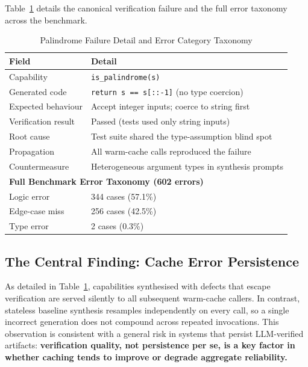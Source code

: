 \documentclass[conference]{IEEEtran}
\begin{document}
Table~\ref{tab:error} details the canonical verification failure and the
full error taxonomy across the benchmark.

\begin{table}[htbp]
  \centering
  \caption{Palindrome Failure Detail and Error Category Taxonomy}
  \label{tab:error}
  \renewcommand{\arraystretch}{1.2}
  \begin{tabular}{ll}
    \toprule
    \textbf{Field} & \textbf{Detail} \\
    \midrule
    Capability         & \texttt{is\_palindrome(s)} \\
    Generated code     & \texttt{return s == s[::-1]} (no type coercion) \\
    Expected behaviour & Accept integer inputs; coerce to string first \\
    Verification result& Passed (tests used only string inputs) \\
    Root cause         & Test suite shared the type-assumption blind spot \\
    Propagation        & All warm-cache calls reproduced the failure \\
    Countermeasure     & Heterogeneous argument types in synthesis prompts \\
    \midrule
    \multicolumn{2}{l}{\textbf{Full Benchmark Error Taxonomy (602 errors)}} \\
    \midrule
    Logic error        & 344 cases (57.1\%)  \\
    Edge-case miss     & 256 cases (42.5\%)  \\
    Type error         & 2 cases (0.3\%)     \\
    \bottomrule
  \end{tabular}
\end{table}

\subsection{The Central Finding: Cache Error Persistence}
\label{subsec:central}

As detailed in Table~\ref{tab:error}, capabilities synthesised with
defects that escape verification are served silently to all subsequent
warm-cache callers.
In contrast, stateless baseline synthesis resamples independently on every
call, so a single incorrect generation does not compound across repeated
invocations.
This observation is consistent with a general risk in systems that persist
LLM-verified artifacts: \textbf{verification quality, not persistence per
se, is a key factor in whether caching tends to improve or degrade
aggregate reliability.}
\end{document}
